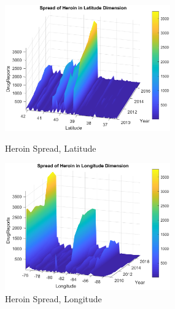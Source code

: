 \documentclass{mcmthesis}
\numberwithin{equation}{section}
\numberwithin{figure}{section}
\numberwithin{table}{section}
\theoremstyle{mydef}
\begin{document}
 \begin{figure}[!htbp]
\begin{minipage}[t]{0.5\linewidth}
\centering
\includegraphics[width=2.8in]{./picture/sphela.eps}
\caption{Heroin Spread, Latitude}
\label{figl1}
\end{minipage}%
\begin{minipage}[t]{0.5\linewidth}
\centering
\includegraphics[width=2.8in]{./picture/sphelong.eps}
\caption{Heroin Spread, Longitude}
\label{figr1}
\end{minipage}
\end{figure}
\end{document}
